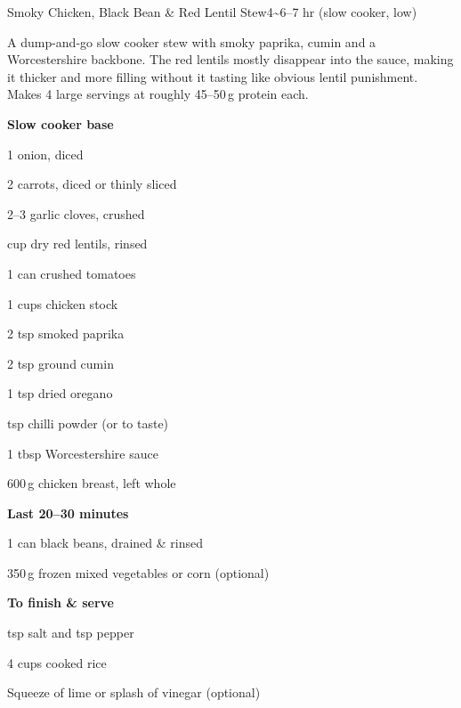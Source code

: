 
\begin{recipebox}{Smoky Chicken, Black Bean \& Red Lentil Stew}{4}{\textasciitilde6--7 hr (slow cooker, low)}

A dump-and-go slow cooker stew with smoky paprika, cumin and a Worcestershire
backbone. The red lentils mostly disappear into the sauce, making it thicker
and more filling without it tasting like obvious lentil punishment. Makes 4
large servings at roughly 45--50\,g protein each.

\begin{ingredients}
  \item[] \textbf{Slow cooker base}
  \item 1 onion, diced
  \item 2 carrots, diced or thinly sliced
  \item 2--3 garlic cloves, crushed
  \item {} cup dry red lentils, rinsed
  \item 1 can crushed tomatoes
  \item 1 cups chicken stock
  \item 2 tsp smoked paprika
  \item 2 tsp ground cumin
  \item 1 tsp dried oregano
  \item {} tsp chilli powder (or to taste)
  \item 1 tbsp Worcestershire sauce
  \item 600\,g chicken breast, left whole
  \item[] \textbf{Last 20--30 minutes}
  \item 1 can black beans, drained \& rinsed
  \item 350\,g frozen mixed vegetables or corn (optional)
  \item[] \textbf{To finish \& serve}
  \item {} tsp salt and  tsp pepper
  \item 4 cups cooked rice
  \item Squeeze of lime or splash of vinegar (optional)
\end{ingredients}


\end{recipebox}
